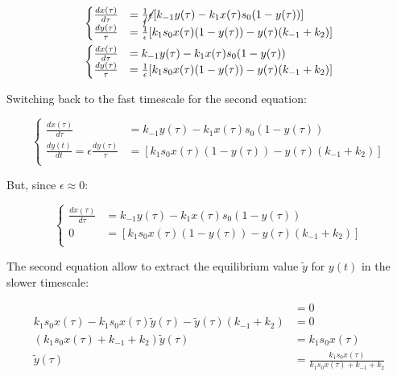   \begin{align*}
    \begin{cases}
      \frac{dx(\tau)}{d\tau} &= \frac{1}{\cancel{\epsilon}}\cancel{\epsilon}[k_{-1}y(\tau) - k_1x(\tau)s_0(1-y(\tau))]\\
      \frac{dy(\tau)}{\tau} &= \frac{1}{\epsilon}[k_1s_0x(\tau)(1-y(\tau)) - y(\tau)(k_{-1}+k_2)]\\
    \end{cases}\\
    \begin{cases}
      \frac{dx(\tau)}{d\tau} &= k_{-1}y(\tau) - k_1x(\tau)s_0(1-y(\tau))\\
      \frac{dy(\tau)}{\tau} &= \frac{1}{\epsilon}[k_1s_0x(\tau)(1-y(\tau)) - y(\tau)(k_{-1}+k_2)]\\
    \end{cases}\\
  \end{align*}

  Switching back to the fast timescale for the second equation:

  $$\begin{cases}
    \frac{dx(\tau)}{d\tau} &= k_{-1}y(\tau) - k_1x(\tau)s_0(1-y(\tau))\\
      \frac{dy(t)}{dt} = \epsilon\frac{dy(\tau)}{\tau} &= [k_1s_0x(\tau)(1-y(\tau)) - y(\tau)(k_{-1}+k_2)]\\
  \end{cases}$$

  But, since $\epsilon \approx 0$:

  $$\begin{cases}
      \frac{dx(\tau)}{d\tau} &= k_{-1}y(\tau) - k_1x(\tau)s_0(1-y(\tau))\\
      0 &= [k_1s_0x(\tau)(1-y(\tau)) - y(\tau)(k_{-1}+k_2)]\\
  \end{cases}$$

  The second equation allow to extract the equilibrium value $\tilde{y}$ for $y(t)$ in the slower timescale:

  \begin{align*}
    [k_1s_0x(\tau)(1-\tilde{y}(\tau)) - \tilde{y}(\tau)(k_{-1}+k_2)] &= 0\\
    k_1s_0x(\tau)-k_1s_0x(\tau)\tilde{y}(\tau) - \tilde{y}(\tau)(k_{-1}+k_2) &= 0\\
    (k_1s_0x(\tau) + k_{-1} + k_2)\tilde{y}(\tau) &= k_1s_0x(\tau)\\
    \tilde{y}(\tau) &= \frac{k_1s_0x(\tau)}{k_1s_0x(\tau) + k_{-1} + k_2}\\
  \end{align*}

